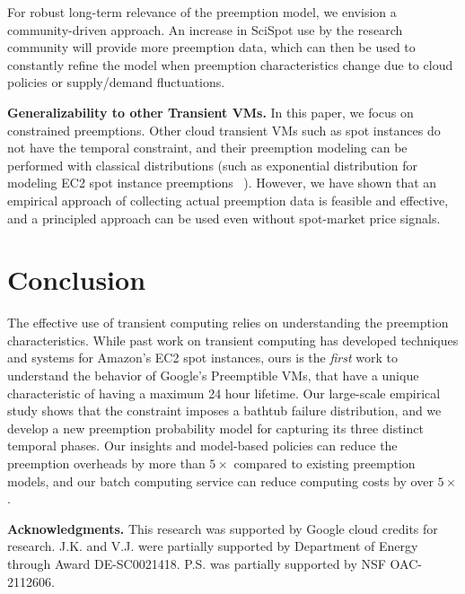 \documentclass[compsoc]{IEEEtran}
\begin{document}
For robust long-term relevance of the preemption model, we envision a community-driven approach.
An increase in SciSpot use by the research community will provide more preemption data, which can then be used to constantly refine the model when preemption characteristics change due to cloud policies or supply/demand fluctuations. 

\noindent \textbf{Generalizability to other Transient VMs.}
In this paper, we focus on constrained preemptions.
Other cloud transient VMs such as spot instances do not have the temporal constraint, and their preemption modeling can be performed with classical distributions (such as exponential distribution for modeling EC2 spot instance preemptions ~\cite{bid-cloud, flint, hotcloud-not-bid}). 
However, we have shown that an empirical approach of collecting actual preemption data is feasible and effective, and a principled approach can be used even without spot-market price signals. 







 

 \section{Conclusion}
 \label{sec:conclusion}


 The effective use of transient computing relies on understanding the preemption characteristics.
While past work on transient computing has developed techniques and systems for Amazon's EC2 spot instances, ours is the \emph{first} work to understand the behavior of Google's Preemptible VMs, that have a unique characteristic of having a maximum 24 hour lifetime.
Our large-scale empirical study shows that the constraint imposes a bathtub failure distribution, and we develop a new preemption probability model for capturing its three distinct temporal phases. 
Our insights and model-based policies can reduce the preemption overheads by more than $5\times$ compared to existing preemption models, and our batch computing service can reduce computing costs by over $5\times$. 


\noindent \textbf{Acknowledgments.}
This research was supported by Google cloud credits for research. 
J.K. and V.J. were partially supported by Department of Energy through Award DE-SC0021418. P.S. was partially supported by NSF OAC-2112606. 


{


}
\end{document}
